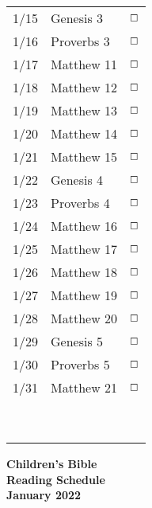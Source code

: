 \documentclass[10pt,landscape,letterpaper]{article}
\begin{document}
\begin{multicols}{5}
\begin{tabular}{p{0.3in}p{0.75in}p{0.4in}}
1/15 & \textcolor[rgb]{0.98,0.00,0.00}{Genesis 3} & \textcolor[rgb]{0.98,0.00,0.00}{$\boxempty$} \\
1/16 & \textcolor[rgb]{0.98,0.00,0.00}{Proverbs 3} & \textcolor[rgb]{0.98,0.00,0.00}{$\boxempty$} \\
1/17 & Matthew 11 & $\boxempty$ \\
1/18 & Matthew 12 & $\boxempty$ \\
1/19 & Matthew 13 & $\boxempty$ \\
1/20 & Matthew 14 & $\boxempty$ \\
1/21 & Matthew 15 & $\boxempty$ \\

1/22 & \textcolor[rgb]{0.98,0.00,0.00}{Genesis 4} & \textcolor[rgb]{0.98,0.00,0.00}{$\boxempty$} \\
1/23 & \textcolor[rgb]{0.98,0.00,0.00}{Proverbs 4} & \textcolor[rgb]{0.98,0.00,0.00}{$\boxempty$} \\
1/24 & Matthew 16 & $\boxempty$ \\
1/25 & Matthew 17 & $\boxempty$ \\
1/26 & Matthew 18 & $\boxempty$ \\
1/27 & Matthew 19 & $\boxempty$ \\
1/28 & Matthew 20 & $\boxempty$ \\

1/29 & \textcolor[rgb]{0.98,0.00,0.00}{Genesis 5} & \textcolor[rgb]{0.98,0.00,0.00}{$\boxempty$} \\
1/30 & \textcolor[rgb]{0.98,0.00,0.00}{Proverbs 5} & \textcolor[rgb]{0.98,0.00,0.00}{$\boxempty$} \\
1/31 & Matthew 21 & $\boxempty$ \\
 &  &  \\
 &  &  \\
 &  &  \\
 &  &  \\
 &  &  \\
 &  &  \\
 &  &  \\
 &  &  \\
 &  &  \\

\end{tabular}

\begin{center}
\textbf{Children's Bible\\
Reading Schedule\\January 2022}
\end{center}


\end{multicols}
\end{document}
